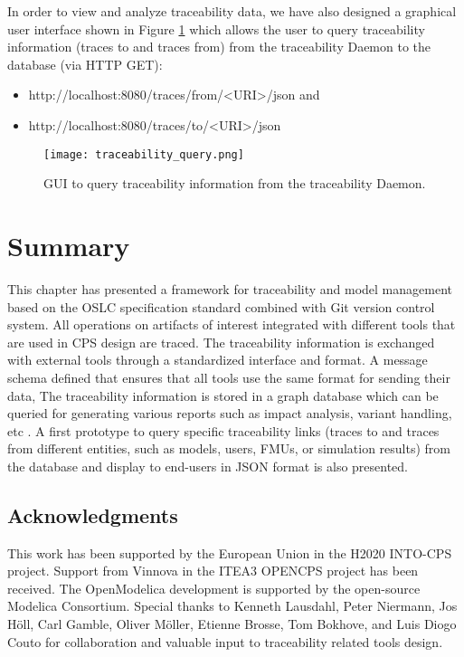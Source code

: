 In order to view and analyze traceability data, we have also designed a graphical user interface shown in
Figure \ref{fig:traceabilityquery} which allows the user to query traceability information (traces to and traces from) from the traceability
Daemon to the database (via HTTP GET):

\begin{itemize}
\item http://localhost:8080/traces/from/<URI>/json and
\item http://localhost:8080/traces/to/<URI>/json 

\end{itemize}

\begin{figure}
	\texttt{[image: traceability\_query.png]}
	\caption{GUI to query traceability information from the traceability Daemon.}
	\label{fig:traceabilityquery}
\end{figure}
 
\section{Summary}
\label{sec:traceabilitysummary}

This chapter has presented a framework for traceability and model management  based on the OSLC specification standard combined with Git version control system. All operations on artifacts of interest integrated with different tools that are used in CPS design are traced. The traceability information is exchanged with external tools through a standardized interface and format. A message schema defined that ensures that all tools use the same format for sending their data,  The traceability information is stored in a graph database which can be queried for generating various reports such as impact analysis, variant handling, etc . A first prototype to query specific traceability links (traces to and traces from different entities, such as models, users, FMUs, or simulation results) from the database and display to end-users in JSON format is also presented. 

\subsection*{Acknowledgments}
\label{sec:traceabilityacknowledgments}

This work has been supported by the European Union in the H2020 INTO-CPS project. Support from
Vinnova in the ITEA3 OPENCPS project has been received. The OpenModelica development is supported
by the open-source Modelica Consortium. Special thanks to Kenneth Lausdahl, Peter Niermann, Jos H\"{o}ll,
Carl Gamble, Oliver M\"{o}ller, Etienne Brosse, Tom Bokhove, and Luis Diogo Couto for collaboration and
valuable input to traceability related tools design.





